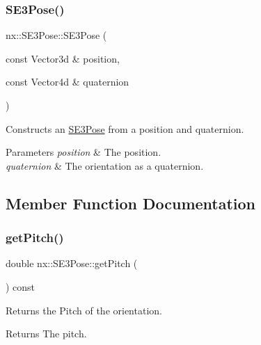 \subsubsection{\texorpdfstring{S\+E3\+Pose()}{SE3Pose()}\hspace{0.1cm}{\footnotesize\ttfamily [3/3]}}
{\footnotesize\ttfamily nx\+::\+S\+E3\+Pose\+::\+S\+E3\+Pose (\begin{DoxyParamCaption}\item[{const Vector3d \&}]{position,  }\item[{const Vector4d \&}]{quaternion }\end{DoxyParamCaption})\hspace{0.3cm}{\ttfamily [inline]}}

Constructs an \hyperlink{structnx_1_1SE3Pose}{S\+E3\+Pose} from a position and quaternion. 
\begin{DoxyParams}{Parameters}
{\em position} & The position. \\
\hline
{\em quaternion} & The orientation as a quaternion. \\
\hline
\end{DoxyParams}


\subsection{Member Function Documentation}
\mbox{\label{structnx_1_1SE3Pose_a98a2f187d971144630219e2f6a989f55}} 
\subsubsection{\texorpdfstring{get\+Pitch()}{getPitch()}}
{\footnotesize\ttfamily double nx\+::\+S\+E3\+Pose\+::get\+Pitch (\begin{DoxyParamCaption}{ }\end{DoxyParamCaption}) const\hspace{0.3cm}{\ttfamily [inline]}}

Returns the Pitch of the orientation. \begin{DoxyReturn}{Returns}
The pitch. 
\end{DoxyReturn}
\mbox{\label{structnx_1_1SE3Pose_afe22fcd642b968043a5e8ef1d284ee39}} 
